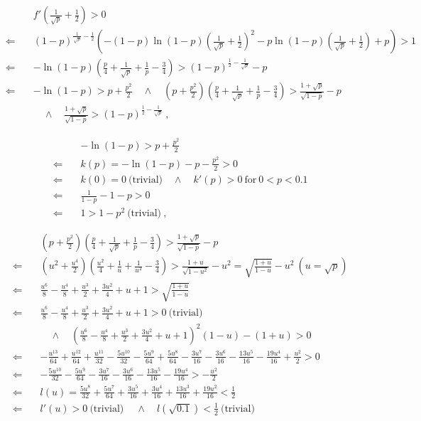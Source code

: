 \documentclass[]{article}
\begin{document}
\begin{align*}
&f'\left(\frac{1}{\sqrt{p}}+\frac{1}{2}\right) > 0\\
\Longleftarrow\quad& (1-p)^{\frac{1}{\sqrt{p}}-\frac{1}{2}}\left(-(1-p)\ln(1-p)\left(\frac{1}{\sqrt{p}}+\frac{1}{2}\right)^2 - p\ln(1-p)\left(\frac{1}{\sqrt{p}}+\frac{1}{2}\right) + p\right) > 1\\
\Longleftarrow\quad&-\ln(1-p)\left(\frac{p}{4}+\frac{1}{\sqrt{p}}+\frac{1}{p}-\frac{3}{4}\right) > (1-p)^{\frac{1}{2}-\frac{1}{\sqrt{p}}} - p\\
\Longleftarrow\quad&-\ln(1-p) > p + \frac{p^2}{2}  \quad\wedge\quad\left(p + \frac{p^2}{2}\right) \left(\frac{p}{4}+\frac{1}{\sqrt{p}}+\frac{1}{p}-\frac{3}{4}\right) > \frac{1 + \sqrt{p}}{\sqrt{1-p}} - p \\& \quad\wedge\quad \frac{1 + \sqrt{p}}{\sqrt{1-p}} >  (1-p)^{\frac{1}{2}-\frac{1}{\sqrt{p}}}\ ,
\end{align*}

\begin{align*}
&-\ln(1-p) > p + \frac{p^2}{2}\\
\Longleftarrow\quad& k(p) = -\ln(1-p) - p - \frac{p^2}{2} > 0\\
\Longleftarrow\quad& k(0) = 0 \ \mbox{(trivial)} \quad\wedge\quad k'(p) > 0 \ \mbox{for}\ 0 < p < 0.1\\
 \Longleftarrow\quad& \frac{1}{1 - p} - 1 - p > 0\\
  \Longleftarrow\quad& 1 > 1 - p^2  \ \mbox{(trivial)} \ ,
\end{align*}

\begin{align*}
&\left(p + \frac{p^2}{2}\right) \left(\frac{p}{4}+\frac{1}{\sqrt{p}}+\frac{1}{p}-\frac{3}{4}\right) > \frac{1 + \sqrt{p}}{\sqrt{1-p}} - p\\
\Longleftarrow\quad&\left(u^2 + \frac{u^4}{2}\right) \left(\frac{u^2}{4}+\frac{1}{u}+\frac{1}{u^2}-\frac{3}{4}\right) > \frac{1 + u}{\sqrt{1-u^2}} - u^2 = \sqrt{\frac{1 + u}{1-u}} - u^2\ (u = \sqrt{p})\\
\Longleftarrow\quad&\frac{u^6}{8}-\frac{u^4}{8}+\frac{u^3}{2}+\frac{3u^2}{4}+u+1 >\sqrt{\frac{1 + u}{1-u}}\\
\Longleftarrow\quad&   \frac{u^6}{8}-\frac{u^4}{8}+\frac{u^3}{2}+\frac{3u^2}{4}+u+1  > 0   \ \mbox{(trivial)} \\&\quad\wedge\quad  \left(\frac{u^6}{8}-\frac{u^4}{8}+\frac{u^3}{2}+\frac{3u^2}{4}+u+1 \right)^2(1-u)-(1+u) > 0\\
\Longleftarrow\quad&-\frac{u^{13}}{64}+\frac{u^{12}}{64}+\frac{u^{11}}{32}-\frac{5u^{10}}{32}-\frac{5u^9}{64}+\frac{5u^8}{64}-\frac{3u^7}{16}-\frac{3u^6}{16}-\frac{13u^5}{16} - \frac{19u^4}{16}+\frac{u^2}{2} > 0\\
\Longleftarrow\quad&-\frac{5u^{10}}{32}-\frac{5u^9}{64}-\frac{3u^7}{16}-\frac{3u^6}{16}-\frac{13u^5}{16} - \frac{19u^4}{16} > -\frac{u^2}{2}\\
\Longleftarrow\quad&l(u) = \frac{5u^{8}}{32}+\frac{5u^7}{64}+\frac{3u^5}{16}+\frac{3u^4}{16}+\frac{13u^3}{16} + \frac{19u^2}{16} < \frac{1}{2}\\
\Longleftarrow\quad&l'(u) > 0\ \mbox{(trivial)} \ \quad\wedge\quad l(\sqrt{0.1}) < \frac{1}{2}\ \mbox{(trivial)}
\end{align*}
\end{document}

